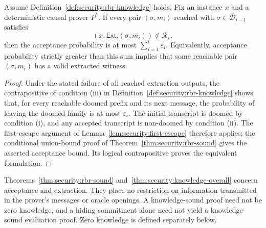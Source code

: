 \begin{theorem}\label{thm:security:knowledge-overall}
Assume Definition~\ref{def:security:rbr-knowledge} holds. Fix an instance $x$ and a deterministic causal prover $P^*$. If every pair $(\sigma,m_i)$ reached with $\sigma\in\mathscr D_{i-1}$ satisfies
\[
 (x,\mathsf{Ext}_i(\sigma,m_i))\notin\mathcal R_\tau,
\]
then the acceptance probability is at most $\sum_{i=1}^t\varepsilon_i$.
Equivalently, acceptance probability strictly greater than this sum implies that some reachable pair $(\sigma,m_i)$ has a valid extracted witness.
\end{theorem}
\begin{proof}
Under the stated failure of all reached extraction outputs, the contrapositive of condition (iii) in Definition~\ref{def:security:rbr-knowledge} shows that, for every reachable doomed prefix and its next message, the probability of leaving the doomed family is at most $\varepsilon_i$. The initial transcript is doomed by condition (i), and any accepted transcript is non-doomed by condition (ii). The first-escape argument of Lemma~\ref{lem:security:first-escape} therefore applies; the conditional union-bound proof of Theorem~\ref{thm:security:rbr-sound} gives the asserted acceptance bound. Its logical contrapositive proves the equivalent formulation.
\end{proof}

\begin{remark}
Theorems~\ref{thm:security:rbr-sound} and~\ref{thm:security:knowledge-overall} concern acceptance and extraction. They place no restriction on information transmitted in the prover's messages or oracle openings. A knowledge-sound proof need not be zero knowledge, and a hiding commitment alone need not yield a knowledge-sound evaluation proof. Zero knowledge is defined separately below.
\end{remark}
